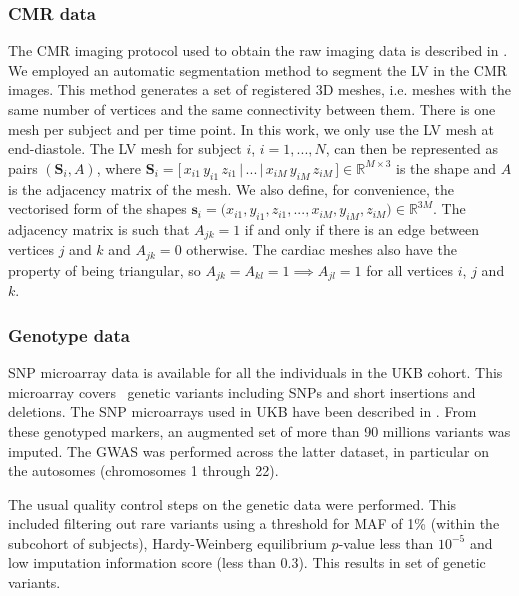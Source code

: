 \subsubsection{CMR data}
The CMR imaging protocol used to obtain the raw imaging data is described in \cite{ref_ukbb_cmr}. 
We employed an automatic segmentation method \cite{ref_rahman} to segment the LV in the CMR images. This method generates a set of registered 3D meshes, i.e. meshes with the same number of vertices and the same connectivity between them. There is one mesh per subject and per time point. In this work, we only use the LV mesh at end-diastole. The LV mesh for subject $i$, $i=1,...,N$, can then be represented as pairs $(\textbf{S}_i, A)$, where $\textbf{S}_i=\big[\,x_{i1}\,y_{i1}\,z_{i1}\,|\,...\,|\,x_{iM}\,y_{iM}\,z_{iM}\,\big]\in \mathbb{R}^{M\times 3}$ is the shape and $A$ is the adjacency matrix of the mesh. We also define, for convenience, the vectorised form of the shapes $\textbf{s}_i=\big(x_{i1},y_{i1},z_{i1},...,x_{iM},y_{iM},z_{iM}\big)\in \mathbb{R}^{3M}$. The adjacency matrix is such that $A_{jk}=1$ if and only if there is an edge between vertices $j$ and $k$ and $A_{jk}=0$ otherwise. The cardiac meshes also have the property of being triangular, so $A_{jk}=A_{kl}=1\implies A_{jl}=1$ for all vertices $i$, $j$ and $k$.

\subsubsection{Genotype data}
SNP microarray data is available for all the individuals in the UKB cohort. This microarray covers \NCALLS\, genetic variants including SNPs and short insertions and deletions. 
The SNP microarrays used in UKB have been described in \cite{ref_ukbb_genetics}. From these genotyped markers, an augmented set of more than 90 millions variants was imputed. The GWAS was performed across the latter dataset, in particular on the autosomes (chromosomes 1 through 22). %

The usual quality control steps on the genetic data were performed. This included filtering out rare variants using a threshold for MAF of 1\% (within the subcohort of \NCMRGBR subjects), Hardy-Weinberg equilibrium $p$-value less than $10^{-5}$ and low imputation information score (less than 0.3). This results in set of \NCMRGBR genetic variants. %

